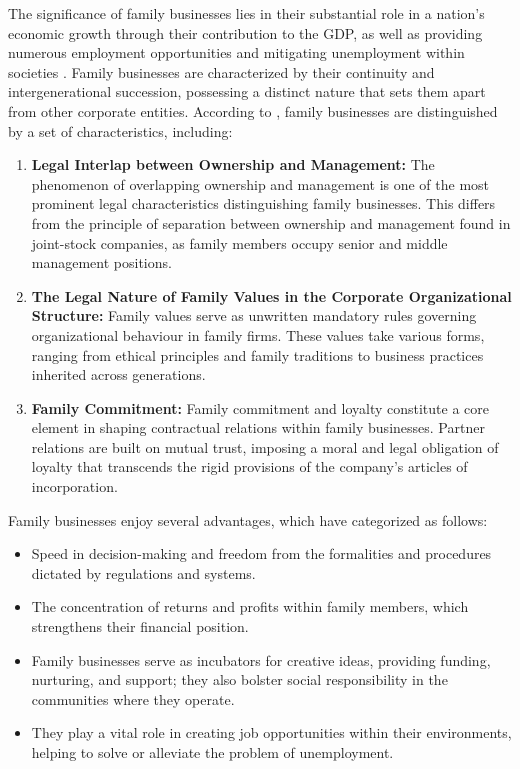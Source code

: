 \documentclass{NSP1}
\begin{document}
The significance of family businesses lies in their substantial role in a nation's economic growth through their contribution to the GDP, as well as providing numerous employment opportunities and mitigating unemployment within societies \cite{ref14,ref15}. Family businesses are characterized by their continuity and intergenerational succession, possessing a distinct nature that sets them apart from other corporate entities. According to \cite{ref16}, family businesses are distinguished by a set of characteristics, including:
\begin{enumerate}
\item[a)] \textbf{Legal Interlap between Ownership and Management:} The phenomenon of overlapping ownership and management is one of the most prominent legal characteristics distinguishing family businesses. This differs from the principle of separation between ownership and management found in joint-stock companies, as family members occupy senior and middle management positions.
\item[b)] \textbf{The Legal Nature of Family Values in the Corporate Organizational Structure:} Family values serve as unwritten mandatory rules governing organizational behaviour in family firms. These values take various forms, ranging from ethical principles and family traditions to business practices inherited across generations.
\item[c)] \textbf{Family Commitment:} Family commitment and loyalty constitute a core element in shaping contractual relations within family businesses. Partner relations are built on mutual trust, imposing a moral and legal obligation of loyalty that transcends the rigid provisions of the company's articles of incorporation.
\end{enumerate}

Family businesses enjoy several advantages, which \cite{ref18,ref17} have categorized as follows:
\begin{itemize}
\item Speed in decision-making and freedom from the formalities and procedures dictated by regulations and systems.
\item The concentration of returns and profits within family members, which strengthens their financial position.
\item Family businesses serve as incubators for creative ideas, providing funding, nurturing, and support; they also bolster social responsibility in the communities where they operate.
\item They play a vital role in creating job opportunities within their environments, helping to solve or alleviate the problem of unemployment.
\end{itemize}
\end{document}
